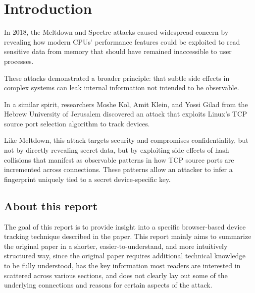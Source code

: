 \documentclass[twocolumn]{report}
\begin{document}
\fontsize{7pt}{8pt}\selectfont
{}



\clearpage
{}
\tableofcontents
\clearpage
\clearpage

\pagestyle{plain}
\clearpage

\section{Introduction}
\label{sec:introduction}

In 2018, the \alert{Meltdown} and \alert{Spectre} attacks caused widespread concern by revealing how modern CPUs’ performance features could be exploited to read sensitive data from memory that should have remained inaccessible to user processes.

These attacks demonstrated a broader principle: that subtle side effects in complex systems can leak internal information not intended to be observable.

In a similar spirit, researchers Moshe Kol, Amit Klein, and Yossi Gilad from the Hebrew University of Jerusalem discovered an attack that exploits Linux’s \alert{TCP source port selection algorithm} to track devices.

Like Meltdown, this attack targets \alert{security} and compromises confidentiality, but not by directly revealing secret data, but by exploiting side effects of \alert{hash collisions} that manifest as observable patterns in how \alert{TCP source ports} are incremented across connections. These patterns allow an attacker to infer a fingerprint uniquely tied to a \alert{secret device-specific key}.

\subsection{About this report}
\label{sec:goal_of_this_report}

The goal of this report is to provide insight into a specific browser-based device tracking technique described in the paper\cite{kol2022devicetrackinglinuxsnew}. This report mainly aims to \alert{summarize} the original paper in a \alert{shorter}, \alert{easier-to-understand}, and \alert{more intuitively structured way}, since the original paper requires additional technical knowledge to be fully understood, has the key information most readers are interested in scattered across various sections, and does not clearly lay out some of the underlying connections and reasons for certain aspects of the attack. 
\end{document}
